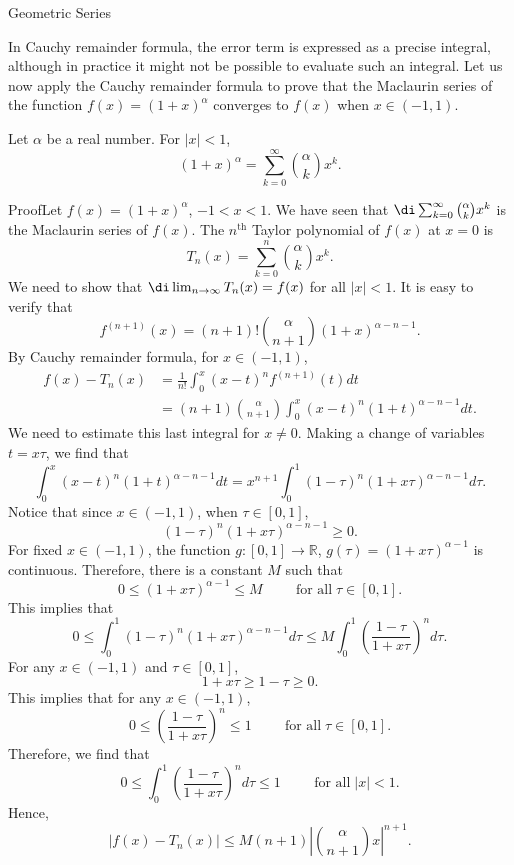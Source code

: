 \begin{example}[label=230305_16]{Geometric Series}
\begin{example}[label=230304_9]{}
\begin{example}{}
\begin{example}{}
In Cauchy remainder formula, the error term is expressed as a precise integral, although in practice it might not be possible to evaluate such an integral. Let us now apply the Cauchy remainder formula to prove that the Maclaurin series of the function $f(x)=(1+x)^{\alpha}$ converges to $f(x)$ when $x\in (-1,1)$.
\begin{theorem}
{}Let $\alpha$ be a real number. For $|x|<1$,
\[(1+x)^{\alpha}= \sum_{k=0}^{\infty}\binom{\alpha}{k}x^k.\]
\end{theorem}
\begin{myproof}{Proof}Let $f(x)=(1+x)^{\alpha}$, $-1<x<1$. We have seen that $\di \sum_{k=0}^{\infty}\binom{\alpha}{k}x^k$ is the Maclaurin series of $f(x)$.
The $n^{\text{th}}$ Taylor polynomial of $f(x)$ at $x=0$ is 
\[T_n(x)=\sum_{k=0}^{n}\binom{\alpha}{k}x^k.\]\bp
We need to show that $\di \lim_{n\to\infty}T_n(x)=f(x)$ for all $|x|<1$.
It is easy to verify that
\[f^{(n+1)}(x)= (n+1)! \binom{\alpha}{n+1}(1+x)^{\alpha-n-1}.\]
By  Cauchy remainder formula,  for $x\in (-1,1)$,
\begin{align*}f(x)-T_n(x)&=\frac{1}{n!}\int_0^x (x-t)^nf^{(n+1)}(t)dt\\&=(n+1)\binom{\alpha}{n+1}\int_0^x(x-t)^n(1+t)^{\alpha-n-1}dt.\end{align*}
We  need to  estimate this last integral for $x\neq 0$. Making a change of variables $t=x\tau$, we find that
\[\int_0^x(x-t)^n(1+t)^{\alpha-n-1}dt=x^{n+1}\int_0^1 (1-\tau)^n(1+x\tau)^{\alpha-n-1}d\tau.\]
Notice that since $x\in (-1,1)$, when $\tau\in [0,1]$, 
\[(1-\tau)^n(1+x\tau)^{\alpha-n-1}\geq 0.\]  For fixed $x\in (-1,1)$, the function $g:[0,1]\to\mathbb{R}$, $g(\tau)=(1+x\tau)^{\alpha-1}$ is continuous.   Therefore, there is a constant $M$ such that 
\[0\leq (1+x\tau)^{\alpha-1}\leq M\hspace{1cm}\text{for all}\;\tau\in [0,1].\]
This implies that
\[0\leq \int_0^1 (1-\tau)^n(1+x\tau)^{\alpha-n-1}d\tau\leq M\int_0^1\left(\frac{1-\tau}{1+x\tau}\right)^{n}d\tau.\]
For any $x\in (-1,1)$ and $\tau\in [0,1]$,
\[1+x\tau\geq 1-\tau\geq 0.\]
 This  implies that for any $x\in (-1,1)$, 
\[0\leq \left(\frac{1-\tau}{1+x\tau}\right)^{n} \leq 1\hspace{1cm}\text{for all}\;\tau\in [0,1].\]\bp
Therefore, we find that
\[0\leq \int_0^1\left(\frac{1-\tau}{1+x\tau}\right)^{n}d\tau\leq 1\hspace{1cm}\text{for all}\;|x|<1.\]Hence,
\begin{equation}\label{eq230307_13}|f(x)-T_n(x)|\leq M (n+1)\left|\binom{\alpha}{n+1}x\right|^{n+1}.\end{equation}

\end{myproof}
\end{example}
\end{example}
\end{example}
\end{example}
